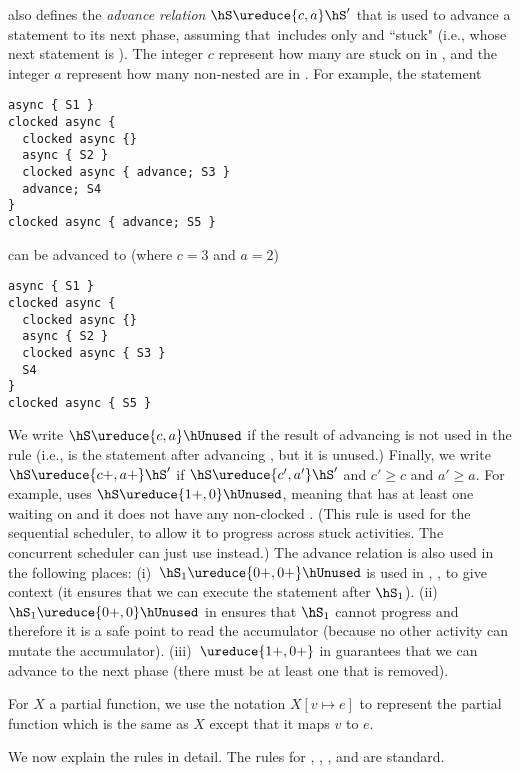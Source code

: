  also defines the \emph{advance relation} $\hS \ureduce{c,a} \hS'$
    that is used to advance a statement to its next phase,
    assuming that~\hS includes only  and ``stuck" 
    (i.e.,  whose next statement is \xadvance).
The integer $c$ represent how many  are stuck on \xadvance in \hS,
    and the integer $a$ represent how many non-nested  are in \hS.
For example, the statement
\begin{lstlisting}
async { S1 }
clocked async {
  clocked async {}
  async { S2 }
  clocked async { advance; S3 }
  advance; S4
}
clocked async { advance; S5 }
\end{lstlisting}
can be advanced to (where $c=3$ and $a=2$)
\begin{lstlisting}
async { S1 }
clocked async {
  clocked async {}
  async { S2 }
  clocked async { S3 }
  S4
}
clocked async { S5 }
\end{lstlisting}
We write  $\hS \ureduce{c,a} \hUnused$ if the result of advancing \hS is not used in the rule
    (i.e., \hUnused is the statement after advancing \hS, but it is unused.)
Finally, we write $\hS \ureduce{c+,a+} \hS'$ if $\hS \ureduce{c',a'} \hS'$ and $c'\geq c$ and $a' \geq a$.
For example,  uses $\hS \ureduce{1+,0} \hUnused$,
    meaning that \hS has at least one  waiting on \xadvance
    and it does not have any non-clocked .
(This rule is used for the sequential scheduler, to allow it to progress across stuck activities.
    The concurrent scheduler can just use  instead.)
The advance relation is also used in the following places:
(i)~$\hS_1 \ureduce{0+,0+} \hUnused$ is used in , , 
    to give context (it ensures that we can execute the statement after $\hS_1$).
(ii)~$\hS_1 \ureduce{0+,0} \hUnused$ in  ensures that $\hS_1$ cannot progress
    and therefore it is a safe point to read the accumulator (because no other activity can mutate the accumulator).
(iii)~$\ureduce{1+,0+}$ in  guarantees that we can advance to the next phase
    (there must be at least one \xadvance that is removed).


For $X$ a partial function, we use the notation
$X[v \mapsto e]$ to represent the partial function which is the same
as $X$ except that it maps $v$ to $e$.

We now explain the rules in detail.
The rules for , , , and 
    are standard.


